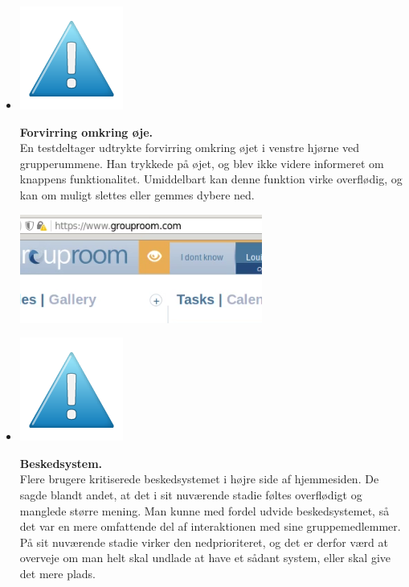 \documentclass[12pt]{article}
\begin{document}
\begin{itemize}
   \item[]       \begin{minipage}{0.07\linewidth}
  \includegraphics[scale=0.3]{Billeder/mindre}
          \end{minipage}\textbf{Forvirring omkring øje.}\\ En testdeltager udtrykte forvirring omkring øjet i venstre hjørne ved grupperummene. Han trykkede på øjet, og blev ikke videre informeret om knappens funktionalitet. Umiddelbart kan denne funktion virke overflødig, og kan om muligt slettes eller gemmes dybere ned.
  
      \begin{center}\includegraphics[scale=0.6]{Billeder/eye}\end{center}


   \item[]       \begin{minipage}{0.07\linewidth}
  \includegraphics[scale=0.3]{Billeder/mindre}
          \end{minipage} \textbf{Beskedsystem.} \\ Flere brugere kritiserede beskedsystemet i højre side af hjemmesiden. De sagde blandt andet, at det i sit nuværende stadie føltes overflødigt og manglede større mening. Man kunne med fordel udvide beskedsystemet, så det var en mere omfattende del af interaktionen med sine gruppemedlemmer. På sit nuværende stadie virker den nedprioriteret, og det er derfor værd at overveje om man helt skal undlade at have et sådant system, eller skal give det mere plads.


\end{itemize}
\end{document}
